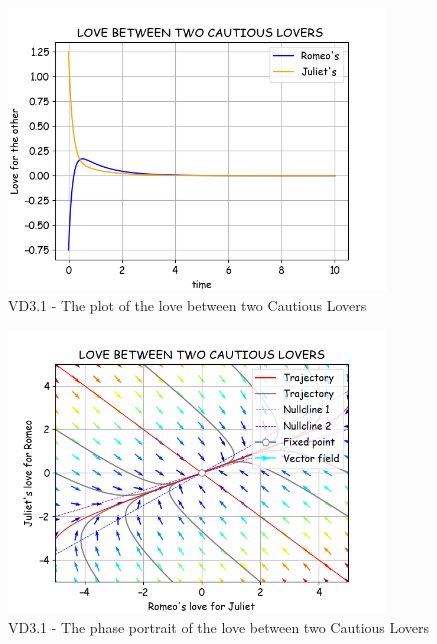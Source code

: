 \pagebreak
\begin{figure}[!htbp]
    \centering
    \includegraphics[width=100mm]{image/bt2/plot3.1.png}
    \caption{VD3.1 - The plot of the love between two Cautious Lovers }
\end{figure}
\begin{figure}[!htbp]
    \centering
    \includegraphics[width=100mm]{image/bt2/pp3.1.png}
    \caption{VD3.1 - The phase portrait of the love between two Cautious Lovers}
\end{figure}

